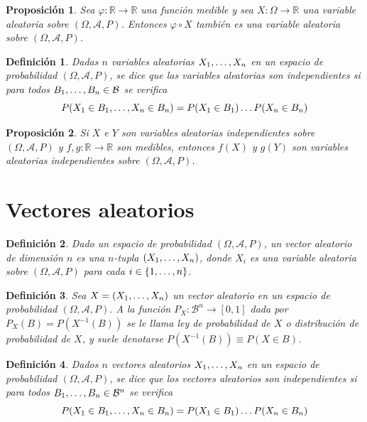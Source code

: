 \documentclass[11pt]{report}
\newtheorem{proposition}{Proposición}
\newtheorem{definition}{Definición}
\theoremstyle{definition}
\newcommand{\R}{\mathbb R}
\begin{document}
\begin{proposition}
Sea $\varphi \colon \R \to \R$ una función medible y sea $X \colon \Omega \to \R$ una variable aleatoria sobre $(\Omega,\mathcal{A},P)$. Entonces $\varphi \circ X$ también es una variable aleatoria sobre $(\Omega,\mathcal{A},P)$.
\end{proposition}

\begin{definition}
Dadas $n$ variables aleatorias $X_1,\mathellipsis,X_n$ en un espacio de probabilidad $(\Omega,\mathcal{A},P)$, se dice que las variables aleatorias son \emph{independientes} si para todos $B_1,\mathellipsis,B_n \in \mathcal{B}$ se verifica
\[P(X_1 \in B_1,\mathellipsis,X_n \in B_n) = P(X_1 \in B_1)\mathellipsis P(X_n \in B_n)\]
\end{definition}

\begin{proposition}
Si $X$ e $Y$ son variables aleatorias independientes sobre $(\Omega,\mathcal{A},P)$ y $f,g \colon \R \to \R$ son medibles, entonces $f(X)$ y $g(Y)$ son variables aleatorias independientes sobre $(\Omega,\mathcal{A},P)$.
\end{proposition}

\section{Vectores aleatorios}

\begin{definition}
Dado un espacio de probabilidad $(\Omega,\mathcal{A},P)$, un \emph{vector aleatorio de dimensión $n$} es una $n$-tupla $(X_1,\mathellipsis,X_n)$, donde $X_i$ es una variable aleatoria sobre $(\Omega,\mathcal{A},P)$ para cada $i \in \{ 1,\mathellipsis,n\}$.
\end{definition}

\begin{definition}
Sea $X = (X_1,\mathellipsis,X_n)$ un vector aleatorio en un espacio de probabilidad $(\Omega,\mathcal{A},P)$. A la función $P_X \colon \mathcal{B}^n \to [0,1]$ dada por $P_X(B) = P(X^{-1}(B))$ se le llama \emph{ley de probabilidad de $X$} o \emph{distribución de probabilidad de $X$}, y suele denotarse $P(X^{-1}(B)) \equiv P(X \in B)$.
\end{definition}

\begin{definition}
Dados $n$ vectores aleatorios $X_1,\mathellipsis,X_n$ en un espacio de probabilidad $(\Omega,\mathcal{A},P)$, se dice que los vectores aleatorios son \emph{independientes} si para todos $B_1,\mathellipsis,B_n \in \mathcal{B}^n$ se verifica
\[P(X_1 \in B_1,\mathellipsis,X_n \in B_n) = P(X_1 \in B_1)\mathellipsis P(X_n \in B_n)\]
\end{definition}
\end{document}
